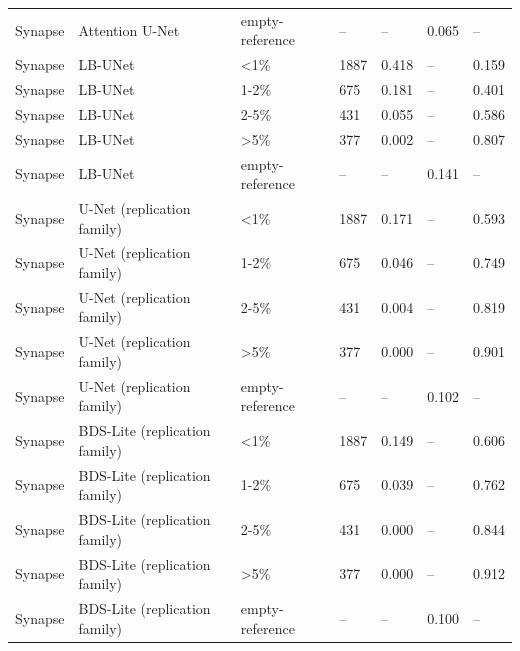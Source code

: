 \begin{tabular}{lllllll}
Synapse & Attention U-Net & empty-reference & -- & -- & 0.065 & -- \\
Synapse & LB-UNet & <1\% & 1887 & 0.418 & -- & 0.159 \\
Synapse & LB-UNet & 1-2\% & 675 & 0.181 & -- & 0.401 \\
Synapse & LB-UNet & 2-5\% & 431 & 0.055 & -- & 0.586 \\
Synapse & LB-UNet & >5\% & 377 & 0.002 & -- & 0.807 \\
Synapse & LB-UNet & empty-reference & -- & -- & 0.141 & -- \\
Synapse & U-Net (replication family) & <1\% & 1887 & 0.171 & -- & 0.593 \\
Synapse & U-Net (replication family) & 1-2\% & 675 & 0.046 & -- & 0.749 \\
Synapse & U-Net (replication family) & 2-5\% & 431 & 0.004 & -- & 0.819 \\
Synapse & U-Net (replication family) & >5\% & 377 & 0.000 & -- & 0.901 \\
Synapse & U-Net (replication family) & empty-reference & -- & -- & 0.102 & -- \\
Synapse & BDS-Lite (replication family) & <1\% & 1887 & 0.149 & -- & 0.606 \\
Synapse & BDS-Lite (replication family) & 1-2\% & 675 & 0.039 & -- & 0.762 \\
Synapse & BDS-Lite (replication family) & 2-5\% & 431 & 0.000 & -- & 0.844 \\
Synapse & BDS-Lite (replication family) & >5\% & 377 & 0.000 & -- & 0.912 \\
Synapse & BDS-Lite (replication family) & empty-reference & -- & -- & 0.100 & -- \\
\bottomrule
\end{tabular}
